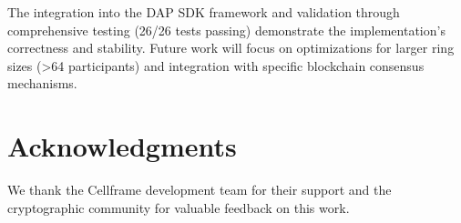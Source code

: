 \documentclass[11pt,a4paper]{article}
\begin{document}
The integration into the DAP SDK framework and validation through comprehensive testing (26/26 tests passing) demonstrate the implementation's correctness and stability. Future work will focus on optimizations for larger ring sizes (>64 participants) and integration with specific blockchain consensus mechanisms.

\section{Acknowledgments}

We thank the Cellframe development team for their support and the cryptographic community for valuable feedback on this work.



\end{document}
